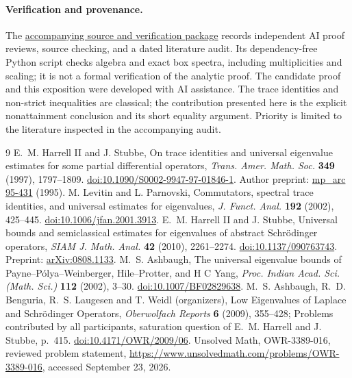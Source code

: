 \documentclass[10pt]{article}
\begin{document}
\paragraph{Verification and provenance.}
The \href{https://aleckriebel.github.io/Math/papers/strict-dirichlet-gap/}{accompanying source and verification package} records independent AI proof reviews, source checking, and a dated literature audit. Its dependency-free Python script checks algebra and exact box spectra, including multiplicities and scaling; it is not a formal verification of the analytic proof. The candidate proof and this exposition were developed with AI assistance. The trace identities and non-strict inequalities are classical; the contribution presented here is the explicit nonattainment conclusion and its short equality argument. Priority is limited to the literature inspected in the accompanying audit.

\begin{thebibliography}{9}
 E.~M. Harrell II and J. Stubbe,
On trace identities and universal eigenvalue estimates for some partial differential operators,
\emph{Trans. Amer. Math. Soc.} \textbf{349} (1997), 1797--1809.
\href{https://doi.org/10.1090/S0002-9947-97-01846-1}{doi:10.1090/S0002-9947-97-01846-1}.
Author preprint: \href{https://web.ma.utexas.edu/mp_arc-bin/mpa?yn=95-431}{mp\_arc 95-431} (1995).
 M. Levitin and L. Parnovski,
Commutators, spectral trace identities, and universal estimates for eigenvalues,
\emph{J. Funct. Anal.} \textbf{192} (2002), 425--445.
\href{https://doi.org/10.1006/jfan.2001.3913}{doi:10.1006/jfan.2001.3913}.
 E.~M. Harrell II and J. Stubbe,
Universal bounds and semiclassical estimates for eigenvalues of abstract Schr\"odinger operators,
\emph{SIAM J. Math. Anal.} \textbf{42} (2010), 2261--2274.
\href{https://doi.org/10.1137/090763743}{doi:10.1137/090763743}.
Preprint: \href{https://arxiv.org/abs/0808.1133}{arXiv:0808.1133}.
 M.~S. Ashbaugh,
The universal eigenvalue bounds of Payne--P\'olya--Weinberger, Hile--Protter, and H C Yang,
\emph{Proc. Indian Acad. Sci. (Math. Sci.)} \textbf{112} (2002), 3--30.
\href{https://doi.org/10.1007/BF02829638}{doi:10.1007/BF02829638}.
 M.~S. Ashbaugh, R.~D. Benguria, R.~S. Laugesen and T. Weidl (organizers),
Low Eigenvalues of Laplace and Schr\"odinger Operators,
\emph{Oberwolfach Reports} \textbf{6} (2009), 355--428;
Problems contributed by all participants, saturation question of E.~M. Harrell and J. Stubbe, p.~415.
\href{https://doi.org/10.4171/OWR/2009/06}{doi:10.4171/OWR/2009/06}.
 Unsolved Math, OWR-3389-016, reviewed problem statement,
\url{https://www.unsolvedmath.com/problems/OWR-3389-016}, accessed September 23, 2026.
\end{thebibliography}
\end{document}
